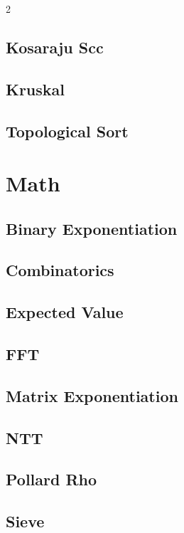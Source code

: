 \documentclass[a4paper,landscape,10pt]{article}
\begin{document}
\begin{multicols*}{2}
\subsection{Kosaraju Scc}

\subsection{Kruskal}

\subsection{Topological Sort}

\section{Math}
\subsection{Binary Exponentiation}

\subsection{Combinatorics}

\subsection{Expected Value}

\subsection{FFT}

\subsection{Matrix Exponentiation}

\subsection{NTT}

\subsection{Pollard Rho}

\subsection{Sieve}


\end{multicols*}
\end{document}
